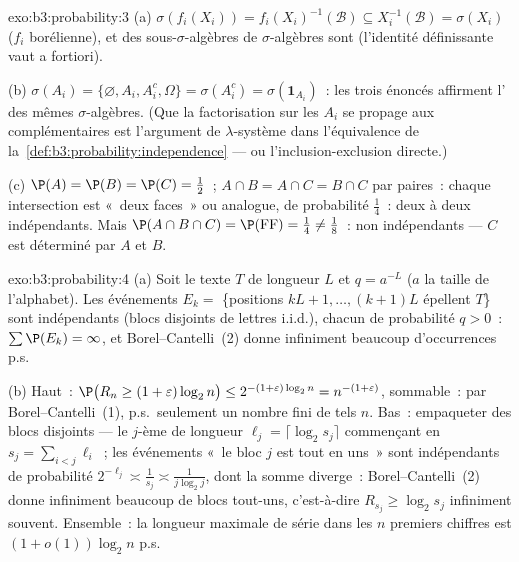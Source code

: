 \begin{solution}{exo:b3:probability:3}
(a) $\sigma(f_i(X_i)) = f_i(X_i)^{-1}(\mathcal B) \subseteq
X_i^{-1}(\mathcal B) = \sigma(X_i)$ ($f_i$ borélienne), et
des sous-$\sigma$-algèbres de $\sigma$-algèbres
 sont  (l'identité définissante
vaut a fortiori).

(b) $\sigma(A_i) = \{\varnothing, A_i, A_i^c, \Omega\} =
\sigma(A_i^c) = \sigma(\mathbf 1_{A_i})$~: les trois
énoncés affirment l' des mêmes
$\sigma$-algèbres. (Que la factorisation sur les $A_i$ se
propage aux complémentaires est l'argument de
$\lambda$-système dans l'équivalence de
la~\cref{def:b3:probability:independence} --- ou
l'inclusion-exclusion directe.)

(c) $\P(A) = \P(B) = \P(C) = \frac12$~; $A\cap B = A\cap C
= B\cap C$ par paires~: chaque intersection est «~deux
faces~» ou analogue, de probabilité $\frac14$~: deux à deux
indépendants. Mais $\P(A\cap B\cap C) = \P(\text{FF}) =
\frac14 \neq \frac18$~: non indépendants --- $C$ est
déterminé par $A$ et $B$.
\end{solution}

\begin{solution}{exo:b3:probability:4}
(a) Soit le texte $T$ de longueur $L$ et $q = a^{-L}$ ($a$
la taille de l'alphabet). Les événements $E_k =$
\{positions $kL+1, \dots, (k+1)L$ épellent $T$\} sont
indépendants (blocs disjoints de lettres i.i.d.), chacun de
probabilité $q > 0$~: $\sum\P(E_k) = \infty$, et
Borel--Cantelli~(2) donne infiniment beaucoup
d'occurrences p.s.

(b) Haut~: $\P\bigl(R_n \geq (1+\varepsilon)\log_2n\bigr)
\leq 2^{-(1+\varepsilon)\log_2n} = n^{-(1+\varepsilon)}$,
sommable~: par Borel--Cantelli~(1), p.s.\ seulement un
nombre fini de tels $n$. Bas~: empaqueter des blocs
disjoints --- le $j$-ème de longueur $\ell_j =
\lceil\log_2s_j\rceil$ commençant en $s_j =
\sum_{i<j}\ell_i$~; les événements «~le bloc $j$ est tout
en uns~» sont indépendants de probabilité $2^{-\ell_j}
\asymp \frac1{s_j} \asymp \frac1{j\log_2 j}$, dont la somme
diverge~: Borel--Cantelli~(2) donne infiniment beaucoup de
blocs tout-uns, c'est-à-dire $R_{s_j} \geq \log_2 s_j$
infiniment souvent. Ensemble~: la longueur maximale de
série dans les $n$ premiers chiffres est $(1 +
o(1))\log_2n$ p.s.
\end{solution}

